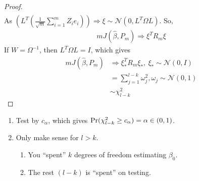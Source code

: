 \documentclass[11pt]{elegantbook}
\begin{document}
\begin{proof}
\begin{equation}
\begin{aligned}
        \end{aligned}
        \nonumber
    \end{equation}
    As $\left(L^T\left(\frac{1}{\sqrt{m}}\sum_{i=1}^mZ_ie_i\right)\right) \Rightarrow \xi \sim \mathcal{N}(0,L^T\Omega L)$. So,
    \begin{equation}
        \begin{aligned}
            mJ(\hat{\beta},P_m) \Rightarrow \xi^TR_m\xi
        \end{aligned}
        \nonumber
    \end{equation}
    If $W=\Omega^{-1}$, then $L^T\Omega L=I$, which gives
    \begin{equation}
        \begin{aligned}
            mJ(\hat{\beta},P_m) &\Rightarrow \xi_*^TR_m\xi_*,\ \xi_*\sim \mathcal{N}(0,I)\\
            &=\sum_{j=1}^{l-k}\omega_j^2,\omega_j\sim \mathcal{N}(0,1)\\
            &\sim \chi^2_{l-k}
        \end{aligned}
        \nonumber
    \end{equation}
\end{proof}
\begin{remark}
    \begin{enumerate}
        \item Test by $c_\alpha$, which gives $\textnormal{Pr}(\chi^2_{l-k}\geq c_\alpha)=\alpha\in (0,1)$.
        \item Only make sense for $l>k$.
        \begin{enumerate}
            \item You ``spent'' $k$ degrees of freedom estimating $\beta_0$.
            \item The rest $(l-k)$ is ``spent'' on testing.
        \end{enumerate}
    \end{enumerate}
\end{remark}
\end{document}
